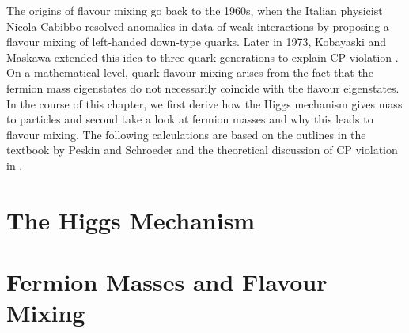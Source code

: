 The origins of flavour mixing go back to the 1960s, when the Italian physicist Nicola Cabibbo resolved anomalies in data of weak interactions by proposing a flavour mixing of left-handed down-type quarks. Later in 1973, Kobayaski and Maskawa extended this idea to three quark generations to explain CP violation \cite{Griffiths}. On a mathematical level, quark flavour mixing arises from the fact that the fermion mass eigenstates do not necessarily coincide with the flavour eigenstates. In the course of this chapter, we first derive how the Higgs mechanism gives mass to particles and second take a look at fermion masses and why this leads to flavour mixing. The following calculations are based on the outlines in the textbook by Peskin and Schroeder \cite[Chapter 20]{Peskin} and the theoretical discussion of CP violation in \mbox{\cite[Chapter 1.2.1]{Tevatron}.}
\section{The Higgs Mechanism}

\clearpage
\section{Fermion Masses and Flavour Mixing}
